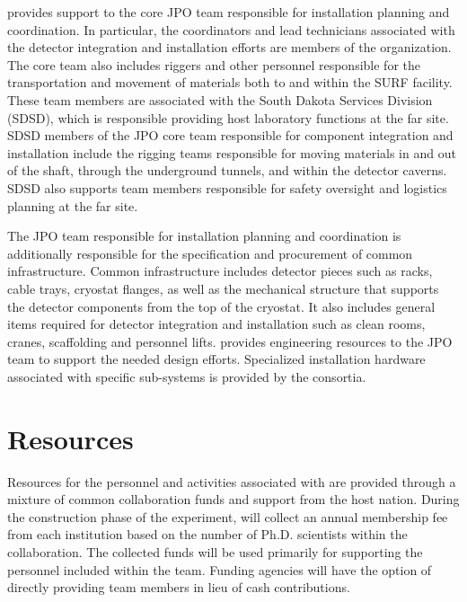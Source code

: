   provides support to the core JPO team
responsible for installation planning and coordination.  In
particular, the coordinators and lead technicians associated with the
detector integration and installation efforts are members of the
 organization.  The core team also includes
riggers and other personnel responsible for the transportation and
movement of materials both to and within the SURF facility.  These
team members are associated with the South Dakota Services Division
(SDSD), which is responsible providing host laboratory functions at
the far site.  SDSD members of the JPO core team responsible for
component integration and installation include the rigging teams
responsible for moving materials in and out of the shaft, through the
underground tunnels, and within the detector caverns.  SDSD also
supports team members responsible for safety oversight and logistics
planning at the far site.

The JPO team responsible for installation planning and coordination is
additionally responsible for the specification and procurement of
common infrastructure.  Common infrastructure includes detector pieces
such as racks, cable trays, cryostat flanges, as well as the
mechanical structure that supports the detector components from the
top of the cryostat.  It also includes general items required for
detector integration and installation such as clean rooms, cranes,
scaffolding and personnel lifts.  
provides engineering resources to the JPO team to support the needed
design efforts. Specialized installation hardware associated with
specific sub-systems is provided by the consortia.

\section{ Resources}
\label{sec:tc_resources}

Resources for the personnel and activities associated with 
are provided through a mixture of common collaboration funds and
support from the host nation.  During the construction phase of the
experiment,  will collect an annual membership fee from
each institution based on the number of Ph.D. scientists within the
collaboration.  The collected funds will be used primarily for
supporting the personnel included within the  team.  Funding
agencies will have the option of directly providing team members in
lieu of cash contributions.

